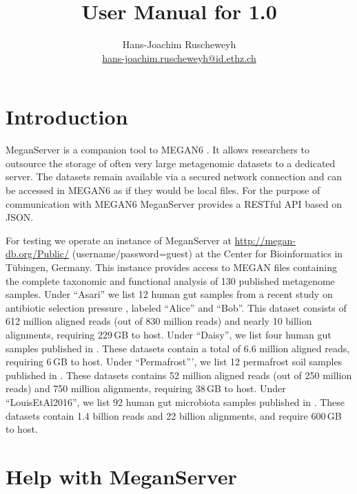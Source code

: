 \documentclass[11pt]{article}
\title{User Manual for \sf{MeganServer}1.0}
\author{Hans-Joachim Ruscheweyh \\ \href{mailto:hans-joachim.ruscheweyh@id.ethz.ch}{hans-joachim.ruscheweyh@id.ethz.ch} }
\begin{document}

\maketitle


{\small
\setcounter{tocdepth}{3}
\tableofcontents
}
\clearpage
\section{Introduction}


MeganServer is a companion tool to MEGAN6 \cite{MEGAN6}. It allows researchers to outsource the storage of often very large metagenomic datasets to a dedicated server. The datasets remain available via a secured network connection and can be accessed in MEGAN6 as if they would be local files. For the purpose of communication with MEGAN6 MeganServer provides a RESTful API based on JSON.

For testing we operate an instance of MeganServer at  \url{http://megan-db.org/Public/} (username/password=guest) at the Center for Bioinformatics in T\"ubingen, Germany. 
This instance provides access to MEGAN files containing the complete taxonomic and functional analysis of 130 published metagenome samples.
Under ``Asari''  we list 12 human gut samples from a recent study on antibiotic selection pressure \cite{WillmannASARI2015}, labeled ``Alice'' and ``Bob''.
This dataset consists of 612 million aligned reads (out of 830 million reads) and nearly 10 billion alignments, requiring 229\,GB to host.
Under ``Daisy'',  we list four human gut samples published in \cite{Voigt2015}. These datasets contain a total of 6.6 million aligned reads, requiring 6\,GB to host.
Under ``Permafrost''', we list 12 permafrost soil samples published in \cite{Mackelprang2011}. These datasets  contains 52 million aligned reads (out of 250 million reads) and 750 million alignments, requiring 38\,GB to host. Under ``LouisEtAl2016'', we list 92 human gut microbiota samples published in \cite{LouisEtAl2016}. These datasets contain 1.4 billion reads and  22 billion alignments, and require  600\,GB to host.


\section{Help with MeganServer}
\end{document}
